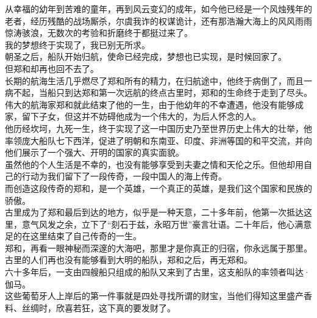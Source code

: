 \begin{multicols}{\theparacolNo}
从幸福的幼年到苦难的童年，再到风云变幻的成年，如今他已经是一个风烛残年的老者，经历残酷的战场厮杀，尔虞我诈的权谋诡计，还有那浩瀚大海上的风风雨雨惊涛骇浪，无数次的考验和折磨终于都挺过来了。\\

我的梦想终于实现了，我已别无所求。\\

朝圣之后，船队开始归航，使命已经完成，梦想也已实现，是时候回家了。\\

但郑和却再也回不去了。\\

长期的航海生活几乎燃尽了郑和所有的精力，在归航途中，他终于病倒了，而且一病不起，当船只到达郑和第一次远航的终点古里时，郑和的生命终于走到了尽头。\\

伟大的航海家郑和就此结束了他的一生，由于他幼年的不幸遭遇，他没有能够成家，留下子女，但这并不妨碍他成为一个伟大的，为后人怀念的人。\\

他历经坎坷，九死一生，终于实现了这一中国历史乃至世界历史上伟大的壮举，他率领庞大船队七下西洋，促进了明朝和东南亚、印度、非洲等国的和平交流，并向他们展示了一个强大、开明的国家的真实面貌。\\

虽然他的个人生活是不幸的，也没有能够享受到夫妻之情和天伦之乐。但他却用自己的行动为我们留下了一段传奇，一段中国人的海上传奇。\\

而创造这段传奇的郑和，是一个英雄，一个真正的英雄，是我们这个国家和民族的骄傲。\\

古里成为了郑和最后到达的地方，似乎是一种天意，二十多年前，他第一次抵达这里，意气风发之余，立下了“刻石于兹，永昭万世”豪言壮语。二十年后，他心满意足的在这里结束了自己传奇的一生。\\

郑和，再看一眼神秘而深邃的大海吧，那里才是你真正的归宿，你永远属于那里。\\

古里的人们再也没有能够看到大明的船队，郑和之后，再无郑和。\\

六十多年后，一支由四艘船只组成的船队又来到了古里，这支船队的率领者叫达·伽马。\\

这些葡萄牙人上岸后的第一件事就是四处寻找所谓的财宝，当他们得知这里盛产香料、丝绸时，欣喜若狂，这下真的要发财了。\\


\end{multicols}
